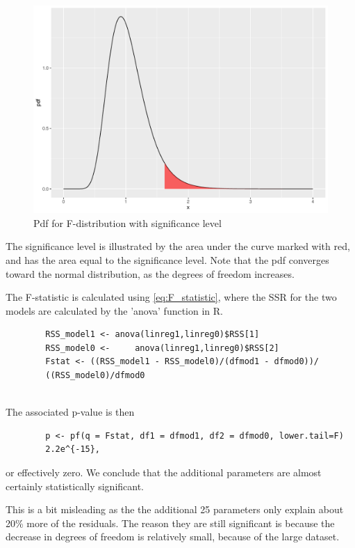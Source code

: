 \begin{example}
    \begin{figure}[H]
        \centering
      \includegraphics[width = 1 \textwidth]{figures/Thea/Fdistsign.pdf}
      \caption{Pdf for F-distribution with significance level}
      \label{fig:my_label}
    \end{figure}
    
    The significance level is illustrated by the area under the curve marked with red, and has the area equal to the significance level. Note that the pdf converges toward the normal distribution, as the degrees of freedom increases.
    
    The F-statistic is calculated using \eqref{eq:F_statistic}, where the SSR for the two models are calculated by the 'anova' function in R. 
    \begin{lstlisting}
        RSS_model1 <- anova(linreg1,linreg0)$RSS[1]
        RSS_model0 <-     anova(linreg1,linreg0)$RSS[2]
        Fstat <- ((RSS_model1 - RSS_model0)/(dfmod1 - dfmod0))/
        ((RSS_model0)/dfmod0
        
    \end{lstlisting}
    
    The associated p-value is then
    
    \begin{lstlisting}
        p <- pf(q = Fstat, df1 = dfmod1, df2 = dfmod0, lower.tail=F)
        2.2e^{-15},
    \end{lstlisting}
    
    or effectively zero. We conclude that the additional  parameters are almost certainly statistically significant.
    
    This is a bit misleading as the the additional 25 parameters only explain about 20\% more of the residuals. The reason they are still significant is because the decrease in degrees of freedom is relatively small, because of the large dataset. 
\end{example}

